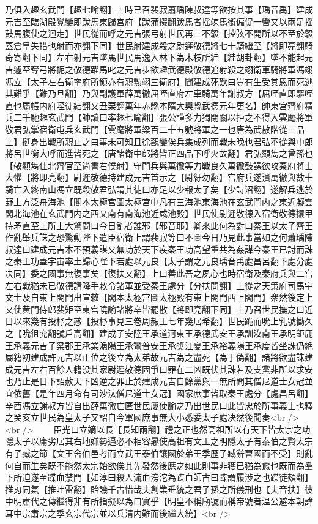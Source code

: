乃俱入趣玄武門【趣七喻翻】上時已召裴寂蕭瑀陳叔達等欲按其事【瑀音禹】建成元吉至臨湖殿覺變即跋馬東歸宫府【跋蒲掇翻跋馬者揺竦馬銜偏促一轡又以兩足揺鼓馬腹使之迴走】世民從而呼之元吉張弓射世民再三不彀【控弦不開所以不至於彀蓋倉皇失措也射而亦翻下同】世民射建成殺之尉遲敬德將七十騎繼至【將即亮翻騎奇寄翻下同】左右射元吉墜馬世民馬逸入林下為木枝所絓【絓胡卦翻】墜不能起元吉遽至奪弓將扼之敬德躍馬叱之元吉步欲趣武德殿敬德追射殺之翊衛車騎將軍馮翊馮立【太子左右衛率府所領亦有親勲翊三衛府】聞建成死歎曰豈有生受其恩而死逃其難乎【難乃旦翻】乃與副護軍薛萬徹屈咥直府左車騎萬年謝叔方【屈咥直即驅咥直也屬帳内府咥徒結翻又丑栗翻萬年赤縣本隋大興縣武德元年更名】帥東宫齊府精兵二千馳趣玄武門【帥讀曰率趣七喻翻】張公謹多力獨閉關以拒之不得入雲麾將軍敬君弘掌宿衛屯兵玄武門【雲麾將軍梁百二十五號將軍之一也唐為武散階從三品上】挺身出戰所親止之曰事未可知且徐觀變俟兵集成列而戰未晚也君弘不從與中郎將呂世衡大呼而進皆死之【唐諸衛中郎將皆正四品下呼火故翻】君弘顯雋之曾孫也【敬顯雋仕北齊官至尚書右僕射】守門兵與萬徹等力戰良久萬徹鼓譟欲攻秦府將士大懼【將即亮翻】尉遲敬德持建成元吉首示之【尉紆勿翻】宫府兵遂潰萬徹與數十騎亡入終南山馮立既殺敬君弘謂其徒曰亦足以少報太子矣【少詩沼翻】遂解兵逃於野上方泛舟海池【閣本太極宫圖太極宫中凡有三海池東海池在玄武門内之東近凝雲閣北海池在玄武門内之西又南有南海池近咸池殿】世民使尉遲敬德入宿衛敬德擐甲持矛直至上所上大驚問曰今日亂者誰邪【邪音耶】卿來此何為對曰秦王以太子齊王作亂舉兵誅之恐驚動陛下遣臣宿衛上謂裴寂等曰不圖今日乃見此事當如之何蕭瑀陳叔達曰建成元吉本不預義謀又無功於天下疾秦王功高望重共為姦謀今秦王已討而誅之秦王功蓋宇宙率土歸心陛下若處以元良【太子謂之元良瑀音禹處昌呂翻下處分處决同】委之國事無復事矣【復扶又翻】上曰善此吾之夙心也時宿衛及秦府兵與二宫左右戰猶未已敬德請降手敕令諸軍並受秦王處分【分扶問翻】上從之天策府司馬宇文士及自東上閤門出宣敕【閣本太極宫圖太極殿有東上閤門西上閤門】衆然後定上又使黄門侍郎裴矩至東宫曉諭諸將卒皆罷散【將即亮翻下同】上乃召世民撫之曰近日以來幾有投杼之惑【投杼事見三卷周赧王七年幾居希翻】世民跪而吮上乳號慟久之【吮徂兖翻號戶高翻】建成子安陸王承道河東王承德武安王承訓汝南王承明鉅鹿王承義元吉子梁郡王承業漁陽王承鸞普安王承奬江夏王承裕義陽王承度皆坐誅仍絶屬籍初建成許元吉以正位之後立為太弟故元吉為之盡死【為于偽翻】諸將欲盡誅建成元吉左右百餘人籍没其家尉遲敬德固爭曰罪在二凶既伏其誅若及支黨非所以求安也乃止是日下詔赦天下凶逆之罪止於建成元吉自餘黨與一無所問其僧尼道士女冠並宜依舊【是年四月命有司沙汰僧尼道士女冠】國家庶事皆取秦王處分【處昌呂翻】辛酉馮立謝叔方皆自出薛萬徹亡匿世民屢使諭之乃出世民曰此皆忠於所事義士也釋之癸亥立世民為皇太子又詔自今軍國庶事無大小悉委太子處决然後聞奏<br />
<br />
　　臣光曰立嫡以長【長知兩翻】禮之正也然高祖所以有天下皆太宗之功隱太子以庸劣居其右地嫌勢逼必不相容曏使高祖有文王之明隱太子有泰伯之賢太宗有子臧之節【文王舍伯邑考而立武王泰伯讓國於弟王季歷子臧辭曹國而不受】則亂何自而生矣既不能然太宗始欲俟其先發然後應之如此則事非獲已猶為愈也既而為羣下所迫遂至蹀血禁門【如淳曰殺人流血滂沱為蹀血師古曰蹀謂履涉之也蹀徒頰翻】推刃同氣【推吐雷翻】貽譏千古惜哉夫創業垂統之君子孫之所儀刑也【夫音扶】彼中明肅代之傳繼得非有所指擬以為口實乎【明皇不稱廟號而稱帝號者温公避本朝諱耳中宗肅宗之季玄宗代宗並以兵清内難而後繼大統】<br />
